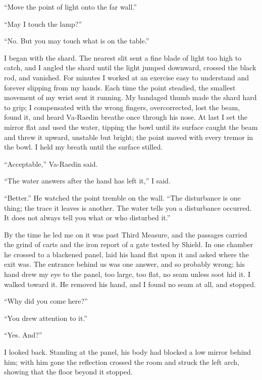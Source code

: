 ``Move the point of light onto the far wall.''\par
``May I touch the lamp?''\par
``No. But you may touch what is on the table.''\par

I began with the shard. The nearest slit sent a fine blade of light too high to catch, and I angled the shard until the light jumped downward, crossed the black rod, and vanished. For minutes I worked at an exercise easy to understand and forever slipping from my hands. Each time the point steadied, the smallest movement of my wrist sent it running. My bandaged thumb made the shard hard to grip; I compensated with the wrong fingers, overcorrected, lost the beam, found it, and heard Va-Raedin breathe once through his nose. At last I set the mirror flat and used the water, tipping the bowl until its surface caught the beam and threw it upward, unstable but bright; the point moved with every tremor in the bowl. I held my breath until the surface stilled.\par

``Acceptable,'' Va-Raedin said.\par
``The water answers after the hand has left it,'' I said.\par
``Better.'' He watched the point tremble on the wall. ``The disturbance is one thing; the trace it leaves is another. The water tells you a disturbance occurred. It does not always tell you what or who disturbed it.''\par

\ornament

By the time he led me on it was past Third Measure, and the passages carried the grind of carts and the iron report of a gate tested by Shield. In one chamber he crossed to a blackened panel, laid his hand flat upon it and asked where the exit was. The entrance behind us was one answer, and so probably wrong; his hand drew my eye to the panel, too large, too flat, no seam unless soot hid it. I walked toward it. He removed his hand, and I found no seam at all, and stopped.\par

``Why did you come here?''\par
``You drew attention to it.''\par
``Yes. And?''\par

I looked back. Standing at the panel, his body had blocked a low mirror behind him; with him gone the reflection crossed the room and struck the left arch, showing that the floor beyond it stopped.\par


